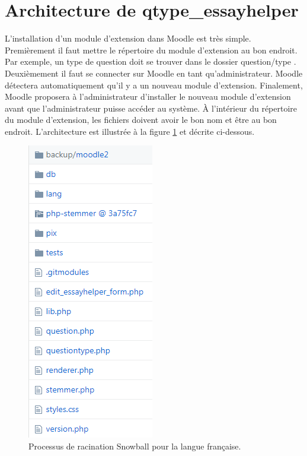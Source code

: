 \section{Architecture de qtype\_essayhelper}
L'installation d'un module d'extension dans Moodle est tr\`es simple.
Premi\`erement il faut mettre le r\'epertoire du module d'extension au bon endroit.
Par exemple, un type de question doit se trouver dans le dossier \og question/type \fg{}.
Deuxi\`emement il faut se connecter sur Moodle en tant qu'administrateur.
Moodle d\'etectera automatiquement qu'il y a un nouveau module d'extension.
Finalement, Moodle proposera \`a l'administrateur d'installer le nouveau module d'extension avant que l'administrateur puisse acc\'eder au syst\`eme.
\`A l'int\'erieur du r\'epertoire du module d'extension, les fichiers doivent avoir le bon nom et \^etre au bon endroit.
L'architecture est illustr\'ee \`a la figure \ref{dev-architecture} et d\'ecrite ci-dessous.
\begin{figure}[h!]
  \includegraphics[scale=0.7]{images/architecture.png}
  \caption{Processus de racination Snowball pour la langue fran\c{c}aise.}
  \label{dev-architecture}
\end{figure}

